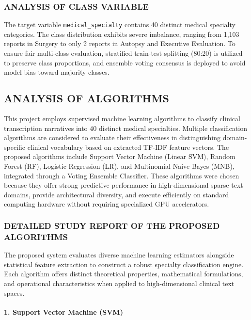 \subsubsection{ANALYSIS OF CLASS VARIABLE}
The target variable \texttt{medical\_specialty} contains 40 distinct medical specialty categories. The class distribution exhibits severe imbalance, ranging from 1,103 reports in Surgery to only 2 reports in Autopsy and Executive Evaluation. To ensure fair multi-class evaluation, stratified train-test splitting (80:20) is utilized to preserve class proportions, and ensemble voting consensus is deployed to avoid model bias toward majority classes.

\clearpage

\subsection{ANALYSIS OF ALGORITHMS}

This project employs supervised machine learning algorithms to classify clinical transcription narratives into 40 distinct medical specialties. Multiple classification algorithms are considered to evaluate their effectiveness in distinguishing domain-specific clinical vocabulary based on extracted TF-IDF feature vectors. The proposed algorithms include Support Vector Machine (Linear SVM), Random Forest (RF), Logistic Regression (LR), and Multinomial Naive Bayes (MNB), integrated through a Voting Ensemble Classifier. These algorithms were chosen because they offer strong predictive performance in high-dimensional sparse text domains, provide architectural diversity, and execute efficiently on standard computing hardware without requiring specialized GPU accelerators.

\subsubsection{DETAILED STUDY REPORT OF THE PROPOSED ALGORITHMS}

The proposed system evaluates diverse machine learning estimators alongside statistical feature extraction to construct a robust specialty classification engine. Each algorithm offers distinct theoretical properties, mathematical formulations, and operational characteristics when applied to high-dimensional clinical text spaces.

\paragraph{1. Support Vector Machine (SVM)}

